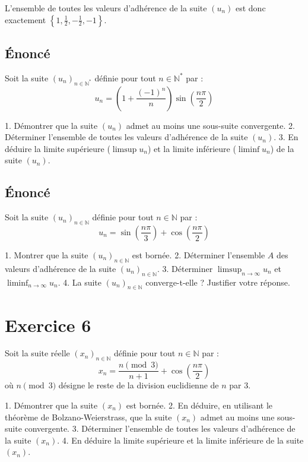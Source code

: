 \documentclass{report}
\begin{document}
L'ensemble de toutes les valeurs d'adhérence de la suite $(u_n)$ est donc exactement $\left\{1, \frac{1}{2}, -\frac{1}{2}, -1\right\}$.

\newpage


\section*{Énoncé}

Soit la suite $(u_n)_{n \in \mathbb{N}^*}$ définie pour tout $n \in \mathbb{N}^*$ par :
$$u_n = \left(1 + \frac{(-1)^n}{n}\right) \sin\left(\frac{n\pi}{2}\right)$$

1.  Démontrer que la suite $(u_n)$ admet au moins une sous-suite convergente.
2.  Déterminer l'ensemble de toutes les valeurs d'adhérence de la suite $(u_n)$.
3.  En déduire la limite supérieure ($\limsup u_n$) et la limite inférieure ($\liminf u_n$) de la suite $(u_n)$.



\newpage


\section*{Énoncé}

Soit la suite $(u_n)_{n \in \mathbb{N}}$ définie pour tout $n \in \mathbb{N}$ par :
$$u_n = \sin\left(\frac{n\pi}{3}\right) + \cos\left(\frac{n\pi}{2}\right)$$

1.  Montrer que la suite $(u_n)_{n \in \mathbb{N}}$ est bornée.
2.  Déterminer l'ensemble $A$ des valeurs d'adhérence de la suite $(u_n)_{n \in \mathbb{N}}$.
3.  Déterminer $\limsup_{n \to \infty} u_n$ et $\liminf_{n \to \infty} u_n$.
4.  La suite $(u_n)_{n \in \mathbb{N}}$ converge-t-elle ? Justifier votre réponse.



\newpage


\chapter*{Exercice 6}

Soit la suite réelle $(x_n)_{n \in \mathbb{N}}$ définie pour tout $n \in \mathbb{N}$ par :
$$x_n = \frac{n \pmod 3}{n+1} + \cos\left(\frac{n\pi}{2}\right)$$
où $n \pmod 3$ désigne le reste de la division euclidienne de $n$ par $3$.

1.  Démontrer que la suite $(x_n)$ est bornée.
2.  En déduire, en utilisant le théorème de Bolzano-Weierstrass, que la suite $(x_n)$ admet au moins une sous-suite convergente.
3.  Déterminer l'ensemble de toutes les valeurs d'adhérence de la suite $(x_n)$.
4.  En déduire la limite supérieure et la limite inférieure de la suite $(x_n)$.
\end{document}
